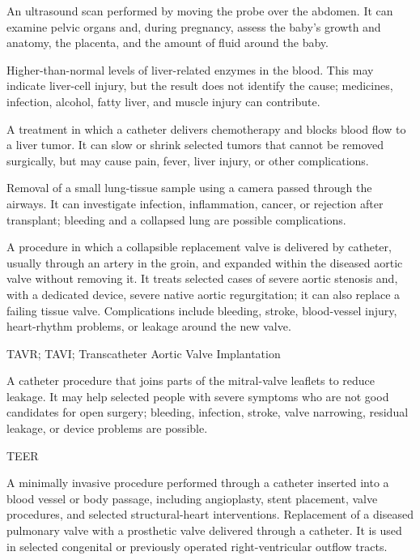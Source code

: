  An ultrasound scan performed by moving the probe over the abdomen. It can examine pelvic organs and, during pregnancy, assess the baby’s growth and anatomy, the placenta, and the amount of fluid around the baby.

 Higher-than-normal levels of liver-related enzymes in the blood. This may indicate liver-cell injury, but the result does not identify the cause; medicines, infection, alcohol, fatty liver, and muscle injury can contribute.

 A treatment in which a catheter delivers chemotherapy and blocks blood flow to a liver tumor. It can slow or shrink selected tumors that cannot be removed surgically, but may cause pain, fever, liver injury, or other complications.

 Removal of a small lung-tissue sample using a camera passed through the airways. It can investigate infection, inflammation, cancer, or rejection after transplant; bleeding and a collapsed lung are possible complications.

 A procedure in which a collapsible replacement valve is delivered by catheter, usually through an artery in the groin, and expanded within the diseased aortic valve without removing it. It treats selected cases of severe aortic stenosis and, with a dedicated device, severe native aortic regurgitation; it can also replace a failing tissue valve. Complications include bleeding, stroke, blood-vessel injury, heart-rhythm problems, or leakage around the new valve.

\synonyms
TAVR; TAVI; Transcatheter Aortic Valve Implantation

 A catheter procedure that joins parts of the mitral-valve leaflets to reduce leakage. It may help selected people with severe symptoms who are not good candidates for open surgery; bleeding, infection, stroke, valve narrowing, residual leakage, or device problems are possible.

\synonyms
TEER

 A minimally invasive procedure performed through a catheter inserted into a blood vessel or body passage, including angioplasty, stent placement, valve procedures, and selected structural-heart interventions.
 Replacement of a diseased pulmonary valve with a prosthetic valve delivered through a catheter. It is used in selected congenital or previously operated right-ventricular outflow tracts.

